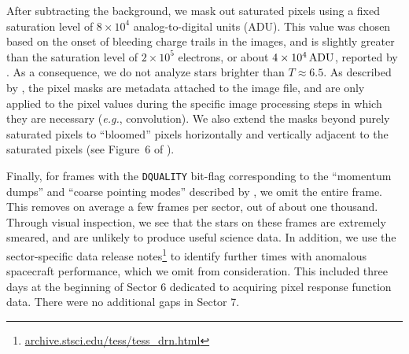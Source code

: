 \documentclass[12pt,twocolumn,tighten]{aastex62}
\begin{document}

After subtracting the background, we mask out saturated pixels using a
fixed saturation level of $8\times10^4$ analog-to-digital units (ADU).
This value was chosen based on the onset of bleeding charge trails in
the images, and is slightly greater than the saturation level of
$2\times10^5$ electrons, or about $4\times10^4\,{\rm ADU}$, reported
by \citet{vanderspek_2018}.  As a consequence, we do not analyze stars
brighter than $T\approx 6.5$.  As described by \citet{Pal_2009}, the
pixel masks are metadata attached to the image file, and are only
applied to the pixel values during the specific image processing steps
in which they are necessary ({\it e.g.}, convolution). We also extend
the masks beyond purely saturated pixels to ``bloomed'' pixels
horizontally and vertically adjacent to the saturated pixels (see
Figure~6 of \citealt{Pal_2009}).

Finally, for frames with the \texttt{DQUALITY} bit-flag corresponding
to the ``momentum dumps'' and ``coarse pointing modes'' described by
\citet{vanderspek_2018}, we omit the entire frame.  This removes on
average a few frames per sector, out of about one thousand. Through
visual inspection, we see that the stars on these frames are extremely
smeared, and are unlikely to produce useful science data.  In
addition, we use the sector-specific data release notes\footnote{\url{
  archive.stsci.edu/tess/tess_drn.html}} to identify further times
with anomalous spacecraft performance, which we omit from
consideration.  This included three days at the beginning of Sector 6
dedicated to acquiring pixel response function data. There were no
additional gaps in Sector 7.
\end{document}
